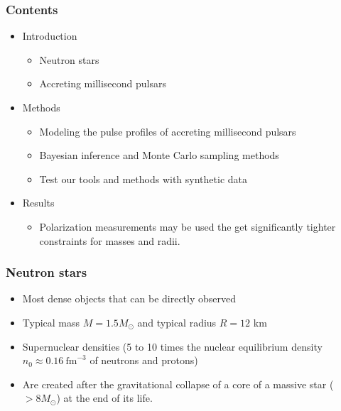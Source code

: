 \documentclass{beamer}
\begin{document}
\begin{frame}
\frametitle{Contents}
\begin{itemize}
\item Introduction
\begin{itemize}
\item Neutron stars
\item Accreting millisecond pulsars
\end{itemize}
\item Methods
\begin{itemize}
\item Modeling the pulse profiles of accreting millisecond pulsars
\item Bayesian inference and Monte Carlo sampling methods
\item Test our tools and methods with synthetic data
\end{itemize}
\item Results
\begin{itemize}
\item Polarization measurements may be used the get
significantly tighter constraints for masses and radii. 
\end{itemize}
\end{itemize}
\end{frame}




\begin{frame}
\frametitle{Neutron stars}
\begin{itemize}
\item Most dense objects that can be directly observed
\item Typical mass $M = 1.5 M_{\odot}$ and typical radius $R =  12$ km
\item Supernuclear densities (5 to 10 times the nuclear equilibrium density $n_{0} \approx 0.16 ~\mathrm{fm}^{-3}$ of neutrons and protons)
\item Are created after the gravitational collapse of a core of a
massive star ($> 8 M_{\odot}$) at the end of its life.
\end{itemize}
\end{frame}
\end{document}
